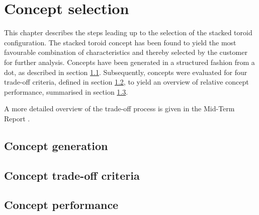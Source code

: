\section{Concept selection}\label{cha:conceptselection}
This chapter describes the steps leading up to the selection of the stacked toroid configuration. The stacked toroid concept has been found to yield the most favourable combination of characteristics and thereby selected by the customer for further analysis. Concepts have been generated in a structured fashion from a \gls{dot}, as described in section \ref{sec:conceptgen}. Subsequently, concepts were evaluated for four trade-off criteria, defined in section \ref{sec:conceptcriteria}, to yield an overview of relative concept performance, summarised in section \ref{sec:conceptperf}. 

A more detailed overview of the trade-off process is given in the Mid-Term Report \cite{Balasooriyan2015b}.

\subsection{Concept generation} \label{sec:conceptgen}


\subsection{Concept trade-off criteria} \label{sec:conceptcriteria}


\subsection{Concept performance} \label{sec:conceptperf}





